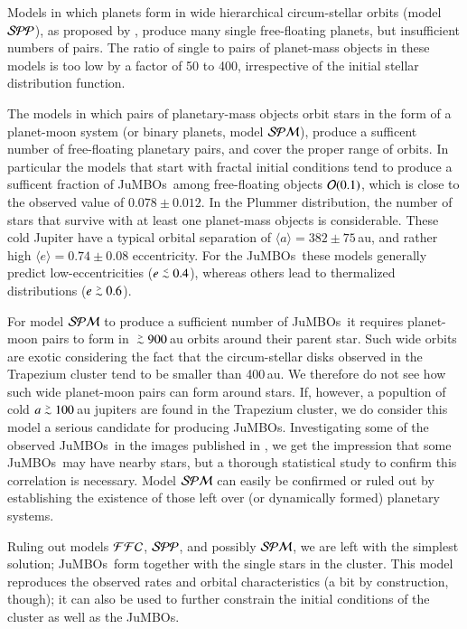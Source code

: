 \documentclass[submission,phys]{lib/SciPost}
\def\apgt{\ {\raise-.5ex\hbox{$\buildrel>\over\sim$}}\ }
\def\aplt{\ {\raise-.5ex\hbox{$\buildrel<\over\sim$}}\ }
\newcommand{\jumbos}{\mbox{JuMBOs}}
\begin{document}
Models in which planets form in wide hierarchical circum-stellar
orbits (model ${\cal SPP}$), as proposed by
\cite{2023arXiv231006016W}, produce many single free-floating planets,
but insufficient numbers of pairs. The ratio of single to pairs of
planet-mass objects in these models is too low by a factor of 50 to
400, irrespective of the initial stellar distribution function.

The models in which pairs of planetary-mass objects orbit stars in the
form of a planet-moon system (or binary planets, model ${\cal SPM}$),
produce a sufficent number of free-floating planetary pairs, and cover
the proper range of orbits.  In particular the models that start with
fractal initial conditions tend to produce a sufficent fraction of
\jumbos\, among free-floating objects ${\cal O}(0.1)$, which is close
to the observed value of $0.078\pm0.012$. In the Plummer distribution,
the number of stars that survive with at least one planet-mass objects
is considerable.  These cold Jupiter have a typical orbital separation
of $\langle a\rangle = 382\pm75$\,au, and rather high $\langle e \rangle
= 0.74\pm 0.08$ eccentricity.  For the \jumbos\, these models
generally predict low-eccentricities ($e\aplt 0.4$), whereas others
lead to thermalized distributions ($e\apgt 0.6$).

For model ${\cal SPM}$ to produce a sufficient number of \jumbos\, it
requires planet-moon pairs to form in $\apgt 900$\,au orbits around
their parent star. Such wide orbits are exotic considering the fact
that the circum-stellar disks observed in the Trapezium cluster tend
to be smaller than 400\,au. We therefore do not see how such wide
planet-moon pairs can form around stars. If, however, a popultion of
cold $a\apgt 100$\,au jupiters are found in the Trapezium cluster, we
do consider this model a serious candidate for producing \jumbos.
Investigating some of the observed \jumbos\ in the images published in
\cite{2023arXiv231001231P}, we get the impression that some \jumbos\,
may have nearby stars, but a thorough statistical study to confirm
this correlation is necessary.  Model ${\cal SPM}$ can easily be
confirmed or ruled out by establishing the existence of those left
over (or dynamically formed) planetary systems.

Ruling out models ${\cal FFC}$, ${\cal SPP}$, and possibly ${\cal
  SPM}$, we are left with the simplest solution; \jumbos\, form
together with the single stars in the cluster.  This model reproduces
the observed rates and orbital characteristics (a bit by construction,
though); it can also be used to further constrain the initial
conditions of the cluster as well as the \jumbos.
\end{document}
